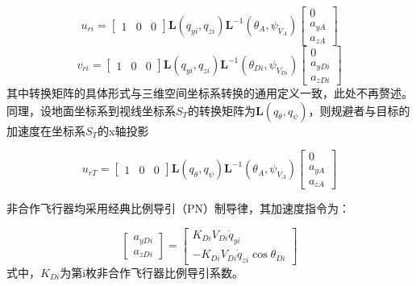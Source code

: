 \begin{equation}
\label{eq:6}
{u_{ri}} = \left[ {\begin{array}{*{20}{c}}
  1&0&0 
\end{array}} \right]{\mathbf{L}}({q_{yi}},{q_{zi}}){{\mathbf{L}}^{ - 1}}({\theta _A},{\psi _{{V_A}}})\left[ {\begin{array}{*{20}{c}}
  0 \\ 
  {{a_{yA}}} \\ 
  {{a_{zA}}} 
\end{array}} \right]
\end{equation}
\begin{equation}
\label{eq:7}
{v_{ri}} = \left[ {\begin{array}{*{20}{c}}
  1&0&0 
\end{array}} \right]{\mathbf{L}}({q_{yi}},{q_{zi}}){{\mathbf{L}}^{ - 1}}({\theta _{Di}},{\psi _{{V_{Di}}}})\left[ {\begin{array}{*{20}{c}}
  0 \\ 
  {{a_{yDi}}} \\ 
  {{a_{zDi}}} 
\end{array}} \right]
\end{equation}
其中转换矩阵的具体形式与三维空间坐标系转换的通用定义一致，此处不再赘述。同理，设地面坐标系到视线坐标系${S_T}$的转换矩阵为${\mathbf{L}}({q_\theta },{q_\psi })$，则规避者与目标的加速度在坐标系${S_T}$的x轴投影

\begin{equation}
\label{eq:8}
{u_{rT}} = \left[ {\begin{array}{*{20}{c}}
  1&0&0 
\end{array}} \right]{\mathbf{L}}({q_\theta },{q_\psi }){{\mathbf{L}}^{ - 1}}({\theta _A},{\psi _{{V_A}}})\left[ {\begin{array}{*{20}{c}}
  0 \\ 
  {{a_{yA}}} \\ 
  {{a_{zA}}} 
\end{array}} \right]
\end{equation}
\begin{assumption}
非合作飞行器均采用经典比例导引（PN）制导律，其加速度指令为：
\end{assumption}
\begin{equation}
\label{eq:9}
\left[ {\begin{array}{*{20}{c}}
  {{a_{yDi}}} \\ 
  {{a_{zDi}}} 
\end{array}} \right] = \left[ {\begin{array}{*{20}{c}}
  {{K_{Di}}{V_{Di}}{{\dot q}_{yi}}} \\ 
  { - {K_{Di}}{V_{Di}}{{\dot q}_{zi}}\cos {\theta _{Di}}} 
\end{array}} \right]
\end{equation}
式中，${K_{Di}}$为第i枚非合作飞行器比例导引系数。

